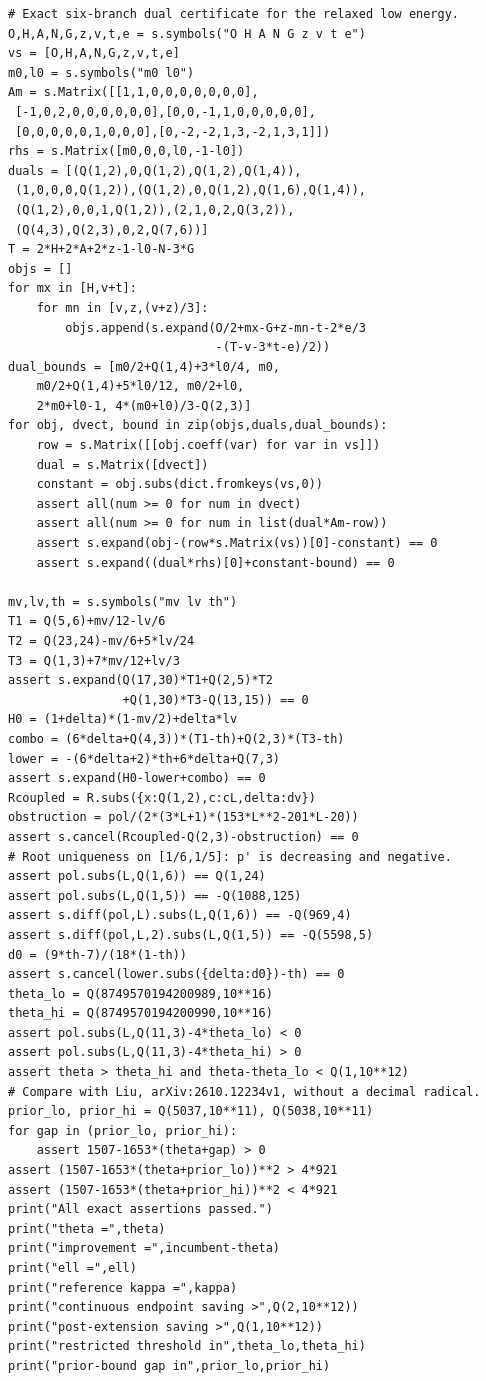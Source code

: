 \documentclass[12pt]{article}
\begin{document}
\begin{verbatim}
# Exact six-branch dual certificate for the relaxed low energy.
O,H,A,N,G,z,v,t,e = s.symbols("O H A N G z v t e")
vs = [O,H,A,N,G,z,v,t,e]
m0,l0 = s.symbols("m0 l0")
Am = s.Matrix([[1,1,0,0,0,0,0,0,0],
 [-1,0,2,0,0,0,0,0,0],[0,0,-1,1,0,0,0,0,0],
 [0,0,0,0,0,1,0,0,0],[0,-2,-2,1,3,-2,1,3,1]])
rhs = s.Matrix([m0,0,0,l0,-1-l0])
duals = [(Q(1,2),0,Q(1,2),Q(1,2),Q(1,4)),
 (1,0,0,0,Q(1,2)),(Q(1,2),0,Q(1,2),Q(1,6),Q(1,4)),
 (Q(1,2),0,0,1,Q(1,2)),(2,1,0,2,Q(3,2)),
 (Q(4,3),Q(2,3),0,2,Q(7,6))]
T = 2*H+2*A+2*z-1-l0-N-3*G
objs = []
for mx in [H,v+t]:
    for mn in [v,z,(v+z)/3]:
        objs.append(s.expand(O/2+mx-G+z-mn-t-2*e/3
                             -(T-v-3*t-e)/2))
dual_bounds = [m0/2+Q(1,4)+3*l0/4, m0,
    m0/2+Q(1,4)+5*l0/12, m0/2+l0,
    2*m0+l0-1, 4*(m0+l0)/3-Q(2,3)]
for obj, dvect, bound in zip(objs,duals,dual_bounds):
    row = s.Matrix([[obj.coeff(var) for var in vs]])
    dual = s.Matrix([dvect])
    constant = obj.subs(dict.fromkeys(vs,0))
    assert all(num >= 0 for num in dvect)
    assert all(num >= 0 for num in list(dual*Am-row))
    assert s.expand(obj-(row*s.Matrix(vs))[0]-constant) == 0
    assert s.expand((dual*rhs)[0]+constant-bound) == 0

mv,lv,th = s.symbols("mv lv th")
T1 = Q(5,6)+mv/12-lv/6
T2 = Q(23,24)-mv/6+5*lv/24
T3 = Q(1,3)+7*mv/12+lv/3
assert s.expand(Q(17,30)*T1+Q(2,5)*T2
                +Q(1,30)*T3-Q(13,15)) == 0
H0 = (1+delta)*(1-mv/2)+delta*lv
combo = (6*delta+Q(4,3))*(T1-th)+Q(2,3)*(T3-th)
lower = -(6*delta+2)*th+6*delta+Q(7,3)
assert s.expand(H0-lower+combo) == 0
Rcoupled = R.subs({x:Q(1,2),c:cL,delta:dv})
obstruction = pol/(2*(3*L+1)*(153*L**2-201*L-20))
assert s.cancel(Rcoupled-Q(2,3)-obstruction) == 0
# Root uniqueness on [1/6,1/5]: p' is decreasing and negative.
assert pol.subs(L,Q(1,6)) == Q(1,24)
assert pol.subs(L,Q(1,5)) == -Q(1088,125)
assert s.diff(pol,L).subs(L,Q(1,6)) == -Q(969,4)
assert s.diff(pol,L,2).subs(L,Q(1,5)) == -Q(5598,5)
d0 = (9*th-7)/(18*(1-th))
assert s.cancel(lower.subs({delta:d0})-th) == 0
theta_lo = Q(8749570194200989,10**16)
theta_hi = Q(8749570194200990,10**16)
assert pol.subs(L,Q(11,3)-4*theta_lo) < 0
assert pol.subs(L,Q(11,3)-4*theta_hi) > 0
assert theta > theta_hi and theta-theta_lo < Q(1,10**12)
# Compare with Liu, arXiv:2610.12234v1, without a decimal radical.
prior_lo, prior_hi = Q(5037,10**11), Q(5038,10**11)
for gap in (prior_lo, prior_hi):
    assert 1507-1653*(theta+gap) > 0
assert (1507-1653*(theta+prior_lo))**2 > 4*921
assert (1507-1653*(theta+prior_hi))**2 < 4*921
print("All exact assertions passed.")
print("theta =",theta)
print("improvement =",incumbent-theta)
print("ell =",ell)
print("reference kappa =",kappa)
print("continuous endpoint saving >",Q(2,10**12))
print("post-extension saving >",Q(1,10**12))
print("restricted threshold in",theta_lo,theta_hi)
print("prior-bound gap in",prior_lo,prior_hi)

\end{verbatim}
\end{document}
